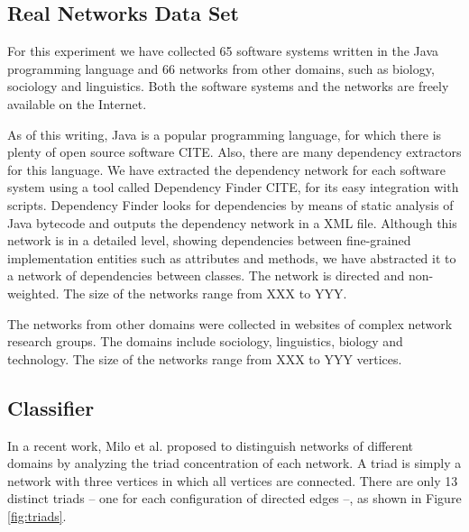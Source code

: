 
\subsection{Real Networks Data Set}

For this experiment we have collected 65 software systems written in the Java
programming language and 66 networks from other domains, such as biology,
sociology and linguistics. Both the software systems and the networks are freely
available on the Internet.

As of this writing, Java is a popular programming language, for which there is
plenty of open source software CITE. Also, there are many dependency extractors
for this language. We have extracted the dependency network for each software
system using a tool called Dependency Finder CITE, for its easy integration with
scripts. Dependency Finder looks for dependencies by means of static analysis of
Java bytecode and outputs the dependency network in a XML file. Although this
network is in a detailed level, showing dependencies between fine-grained
implementation entities such as attributes and methods, we have abstracted it to
a network of dependencies between classes. The network is directed and
non-weighted. The size of the networks range from XXX to YYY.


The networks from other domains were collected in websites of complex network
research groups. The domains include sociology, linguistics, biology and
technology. The size of the networks range from XXX to YYY vertices.

\subsection{Classifier} %

In a recent work, Milo et al. proposed to distinguish networks of different
domains by analyzing the triad concentration of each network. A triad is simply
a network with three vertices in which all vertices are connected. There are
only 13 distinct triads -- one for each configuration of directed edges --, as
shown in Figure \ref{fig:triads}.
\cite{Milo2002}

